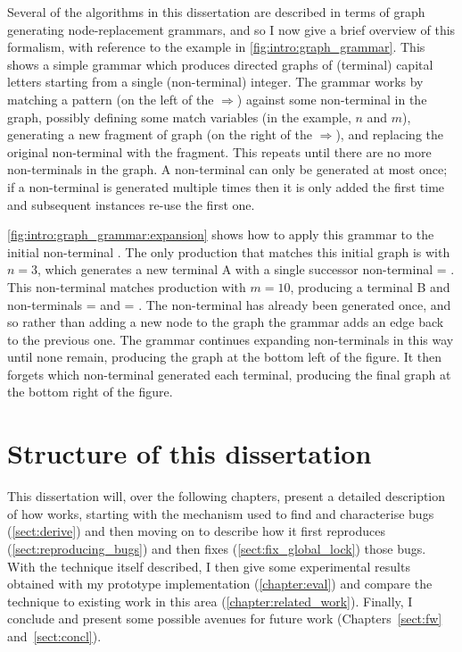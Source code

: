\noindent
Several of the algorithms in this dissertation are described in terms
of graph generating node-replacement grammars, and so I now give a
brief overview of this formalism, with reference to the example in
\autoref{fig:intro:graph_grammar}.  This shows a simple grammar which
produces directed graphs of (terminal) capital letters starting from a
single (non-terminal) integer.  The grammar works by matching a
pattern (on the left of the $\Rightarrow$) against some non-terminal
in the graph, possibly defining some match variables (in the example,
$n$ and $m$), generating a new fragment of graph (on the right of the
$\Rightarrow$), and replacing the original non-terminal with the
fragment.  This repeats until there are no more non-terminals in the
graph.  A non-terminal can only be generated at most once; if a
non-terminal is generated multiple times then it is only added the
first time and subsequent instances re-use the first one.

\autoref{fig:intro:graph_grammar:expansion} shows how to apply this
grammar to the initial non-terminal .  The only production
that matches this initial graph is  with $n = 3$, which
generates a new terminal A with a single successor non-terminal
 = .  This non-terminal matches production
 with $m=10$, producing a terminal B and non-terminals
= and  =
.  The  non-terminal has already been generated
once, and so rather than adding a new node to the graph the grammar
adds an edge back to the previous one.  The grammar continues
expanding non-terminals in this way until none remain, producing the
graph at the bottom left of the figure.  It then forgets which
non-terminal generated each terminal, producing the final graph at the
bottom right of the figure.

\section{Structure of this dissertation}

This dissertation will, over the following chapters, present a
detailed description of how {\technique} works, starting with the
mechanism used to find and characterise bugs (\autoref{sect:derive})
and then moving on to describe how it first reproduces
(\autoref{sect:reproducing_bugs}) and then fixes
(\autoref{sect:fix_global_lock}) those bugs.  With the technique
itself described, I then give some experimental results obtained with
my prototype implementation {\implementation} (\autoref{chapter:eval})
and compare the technique to existing work in this area
(\autoref{chapter:related_work}).  Finally, I conclude and present
some possible avenues for future work (Chapters~\ref{sect:fw}
and~\ref{sect:concl}).
